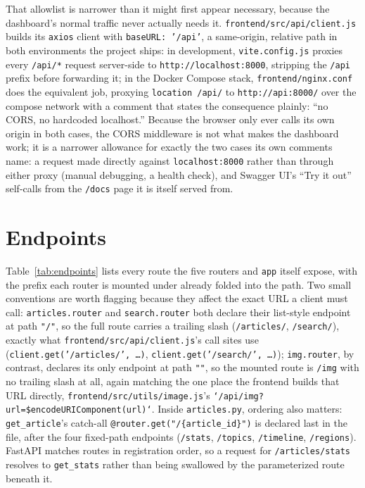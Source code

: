 \begin{sloppypar}
That allowlist is narrower than it might first appear necessary, because the dashboard's normal traffic never actually needs it. \texttt{frontend/\allowbreak src/\allowbreak api/\allowbreak client.js} builds its \texttt{axios} client with \texttt{baseURL: '/api'}, a same-origin, relative path in both environments the project ships: in development, \texttt{vite.config.js} proxies every \texttt{/api/*} request server-side to \texttt{http://localhost:8000}, stripping the \texttt{/api} prefix before forwarding it; in the Docker Compose stack, \texttt{frontend/\allowbreak nginx.conf} does the equivalent job, proxying \texttt{location /api/} to \texttt{http://api:8000/} over the compose network with a comment that states the consequence plainly: ``no CORS, no hardcoded localhost.'' Because the browser only ever calls its own origin in both cases, the CORS middleware is not what makes the dashboard work; it is a narrower allowance for exactly the two cases its own comments name: a request made directly against \texttt{localhost:8000} rather than through either proxy (manual debugging, a health check), and Swagger UI's ``Try it out'' self-calls from the \texttt{/docs} page it is itself served from.
\end{sloppypar}

\section{Endpoints}
\label{sec:endpoints}
\begin{sloppypar}
Table~\ref{tab:endpoints} lists every route the five routers and \texttt{app} itself expose, with the prefix each router is mounted under already folded into the path. Two small conventions are worth flagging because they affect the exact URL a client must call: \texttt{articles.router} and \texttt{search.router} both declare their list-style endpoint at path \texttt{"/"}, so the full route carries a trailing slash (\texttt{/articles/}, \texttt{/search/}), exactly what \texttt{frontend/\allowbreak src/\allowbreak api/\allowbreak client.js}'s call sites use (\texttt{client.get('/articles/', \ldots)}, \texttt{client.get('/search/', \ldots)}); \texttt{img.router}, by contrast, declares its only endpoint at path \texttt{""}, so the mounted route is \texttt{/img} with no trailing slash at all, again matching the one place the frontend builds that URL directly, \texttt{frontend/\allowbreak src/\allowbreak utils/\allowbreak image.js}'s \texttt{`/api/img?url=\${encodeURIComponent(url)}`}. Inside \texttt{articles.py}, ordering also matters: \texttt{get\_article}'s catch-all \texttt{@router.get("/\{article\_id\}")} is declared last in the file, after the four fixed-path endpoints (\texttt{/stats}, \texttt{/topics}, \texttt{/timeline}, \texttt{/regions}). FastAPI matches routes in registration order, so a request for \texttt{/articles/stats} resolves to \texttt{get\_stats} rather than being swallowed by the parameterized route beneath it.
\end{sloppypar}

